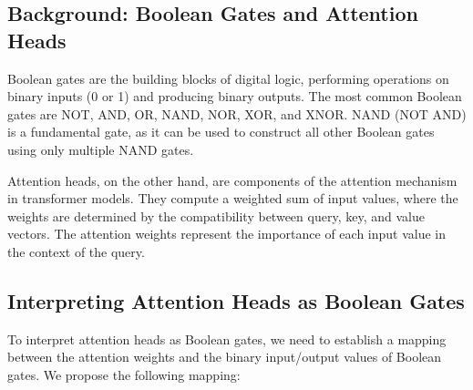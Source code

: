 \subsection{Background: Boolean Gates and Attention Heads}













Boolean gates are the building blocks of digital logic, performing operations on binary inputs (0 or 1) and producing binary outputs. The most common Boolean gates are NOT, AND, OR, NAND, NOR, XOR, and XNOR. NAND (NOT AND) is a fundamental gate, as it can be used to construct all other Boolean gates using only multiple NAND gates.













Attention heads, on the other hand, are components of the attention mechanism in transformer models. They compute a weighted sum of input values, where the weights are determined by the compatibility between query, key, and value vectors. The attention weights represent the importance of each input value in the context of the query.













\subsection{Interpreting Attention Heads as Boolean Gates}













To interpret attention heads as Boolean gates, we need to establish a mapping between the attention weights and the binary input/output values of Boolean gates. We propose the following mapping:













